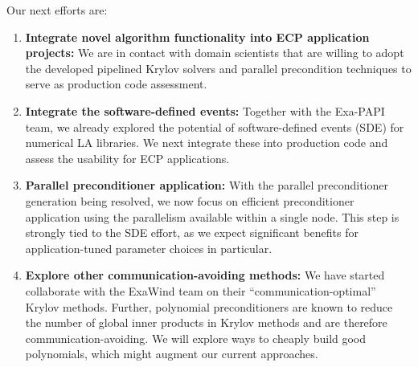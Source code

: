 Our next efforts are:
\begin{enumerate}
	\item \textbf{Integrate novel algorithm functionality into ECP application 
	projects:} We are in contact with domain scientists that are willing to 
	adopt the developed pipelined Krylov solvers and parallel precondition 
	techniques to serve as production code assessment.
	\item \textbf{Integrate the software-defined events:} Together with the 
	Exa-PAPI team, we already explored the potential of software-defined events 
	(SDE) for numerical LA libraries. We next integrate these into production 
	code and assess the usability for ECP applications.
	\item \textbf{Parallel preconditioner application:} With the parallel 
	preconditioner generation being resolved, we now focus on efficient 
	preconditioner application using the parallelism available within a single 
	node. This step is strongly tied to the SDE effort, as we expect significant 
	benefits for application-tuned parameter choices in particular.
	\item \textbf{Explore other communication-avoiding methods:} We have 
	started collaborate with the ExaWind team on their 
	``communication-optimal'' Krylov methods. Further, polynomial 
	preconditioners are known to reduce the number of global inner products in 
	Krylov methods and are therefore communication-avoiding. We will explore 
	ways to cheaply build good polynomials, which might augment our current 
	approaches.
\end{enumerate}
